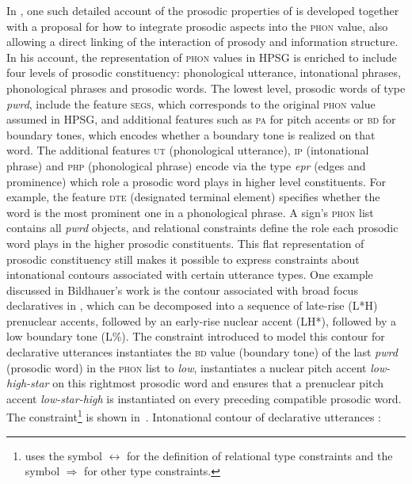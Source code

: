 \documentclass[output=paper,biblatex,babelshorthands,newtxmath,draftmode,colorlinks,citecolor=brown]{langscibook}
\begin{document}
In , one such detailed account of the prosodic
properties of  is developed together with a proposal for how to
integrate prosodic aspects into the \textsc{phon} value, also allowing
a direct linking of the interaction of prosody and information
structure.  In his account, the representation of \textsc{phon} values
in HPSG is enriched to include four levels of prosodic constituency:
phonological utterance, intonational phrases, phonological
phrases and prosodic words. The lowest level, prosodic words of type
\textit{pwrd}, include the feature \textsc{segs}, which corresponds to
the original \textsc{phon} value assumed in HPSG, and additional
features such as \textsc{pa} for pitch accents or \textsc{bd} for
boundary tones, which encodes whether a boundary tone is realized on that
word. The additional features \textsc{ut} (phonological utterance),
\textsc{ip} (intonational phrase) and \textsc{php} (phonological phrase)
encode via the type \textit{epr} (edges and prominence) which role
a prosodic word plays in higher level constituents. For example, the
feature \textsc{dte} (designated terminal element) specifies whether
the word is the most prominent one in a phonological phrase. A sign's
\textsc{phon} list contains all \textit{pwrd} objects, and
relational constraints define the role each prosodic word plays in
the higher prosodic constituents. This flat representation of prosodic
constituency still makes it possible to express constraints about intonational
contours associated with certain utterance types. One example
discussed in Bildhauer's work is the contour associated with broad
focus declaratives in , which can be decomposed into a
sequence of late-rise (L*H) prenuclear accents, followed by an
early-rise nuclear accent (LH*), followed by a low boundary tone
(L\%). The constraint introduced to model this contour for declarative
utterances instantiates the \textsc{bd} value (boundary tone) of
the last \textit{pwrd} (prosodic word) in the \textsc{phon} list to \textit{low}, instantiates
a nuclear pitch accent \textit{low-high-star} on this rightmost
prosodic word and ensures that a prenuclear pitch accent
\textit{low-star-high} is instantiated on every preceding compatible
prosodic word. The constraint\footnote{\citet{Bildhauer2008a} uses the symbol $\leftrightarrow$ for the definition of relational type constraints and the symbol $\Rightarrow$ for other type constraints.} is shown in~.
\ea
Intonational contour of  declarative utterances \citep[142]{Bildhauer2008a}:\\
\end{document}
